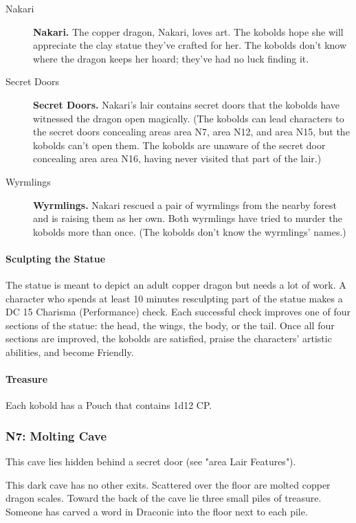 \documentclass[letterpaper, 11pt, twocolumn]{dndbook}
\begin{document}
\begin{description}
\item[Nakari] \textbf{Nakari.} The copper dragon, Nakari, loves art. The kobolds hope she will appreciate the clay statue they've crafted for her. The kobolds don't know where the dragon keeps her hoard; they've had no luck finding it.
\item[Secret Doors] \textbf{Secret Doors.} Nakari's lair contains secret doors that the kobolds have witnessed the dragon open magically. (The kobolds can lead characters to the secret doors concealing areas area N7, area N12, and area N15, but the kobolds can't open them. The kobolds are unaware of the secret door concealing area area N16, having never visited that part of the lair.)
\item[Wyrmlings] \textbf{Wyrmlings.} Nakari rescued a pair of wyrmlings from the nearby forest and is raising them as her own. Both wyrmlings have tried to murder the kobolds more than once. (The kobolds don't know the wyrmlings' names.)
\end{description}

\paragraph{Sculpting the Statue}

The statue is meant to depict an adult copper dragon but needs a lot of work. A character who spends at least 10 minutes resculpting part of the statue makes a DC 15 Charisma (Performance) check. Each successful check improves one of four sections of the statue: the head, the wings, the body, or the tail. Once all four sections are improved, the kobolds are satisfied, praise the characters' artistic abilities, and become Friendly.

\paragraph{Treasure}

Each kobold has a Pouch that contains 1d12 CP.

\subsubsection{N7: Molting Cave}

This cave lies hidden behind a secret door (see "area Lair Features").

\begin{DndReadAloud}
This dark cave has no other exits. Scattered over the floor are molted copper dragon scales. Toward the back of the cave lie three small piles of treasure. Someone has carved a word in Draconic into the floor next to each pile.
\end{DndReadAloud}
\end{document}

